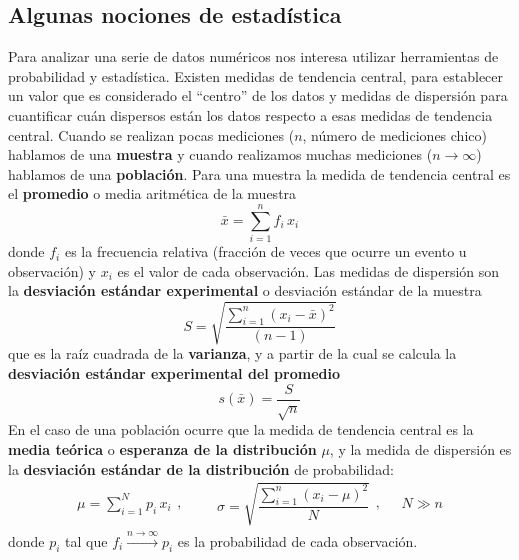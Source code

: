 \subsection{Algunas nociones de estadística}
Para analizar una serie de datos numéricos nos interesa utilizar herramientas de probabilidad y estadística.
Existen medidas de tendencia central, para establecer un valor que es considerado el ``centro'' de los datos y medidas de dispersión para cuantificar cuán dispersos están los datos respecto a esas medidas de tendencia central. Cuando se realizan pocas mediciones ($n$, número de mediciones chico) hablamos de una \textbf{muestra} y cuando realizamos muchas mediciones ($n\xrightarrow{}\infty$) hablamos de una \textbf{población}.
Para una muestra la medida de tendencia central es el \textbf{promedio} o media aritmética de la muestra
\begin{equation}
    \bar{x} = \sum_{i=1}^n f_i\,x_i
\end{equation}
donde $f_i$ es la frecuencia relativa (fracción de veces que ocurre un evento u observación) y $x_i$ es el valor de cada observación. Las medidas de dispersión son la \textbf{desviación estándar experimental} o desviación estándar de la muestra
\begin{equation}
    S = \sqrt{\frac{\sum_{i=1}^n {(x_i - \bar{x})}^2}{(n - 1)}}
\end{equation}
que es la raíz cuadrada de la \textbf{varianza}, y a partir de la cual se calcula la \textbf{desviación estándar experimental del promedio}
\begin{equation}
    s(\bar{x}) = \frac{S}{\sqrt{n}}
\end{equation}
En el caso de una población ocurre que la medida de tendencia central es la \textbf{media teórica} o \textbf{esperanza de la distribución} $\mu$, y la medida de dispersión es la \textbf{desviación estándar de la distribución} de probabilidad:
\begin{equation} 
\begin{split}
    \mu = \sum_{i=1}^N p_i\,x_i
\end{split},
\quad \quad
\begin{split}
    \sigma = \sqrt{\dfrac{\sum_{i=1}^n {(x_i - \mu)}^2}{N}}
\end{split},
\quad
\begin{split}
    N\gg n
\end{split}
\end{equation} donde $p_i$ tal que $f_i\xrightarrow{n\xrightarrow{}\infty}p_i$ es la probabilidad de cada observación.

